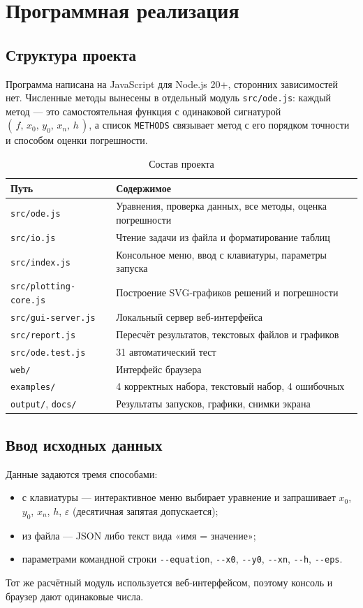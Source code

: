 \documentclass[12pt,a4paper]{article}
\begin{document}
\section{Программная реализация}

\subsection{Структура проекта}
Программа написана на JavaScript для Node.js 20+, сторонних зависимостей нет.
Численные методы вынесены в отдельный модуль \texttt{src/ode.js}: каждый метод
--- это самостоятельная функция с одинаковой сигнатурой
$(\,f,\,x_0,\,y_0,\,x_n,\,h\,)$, а список \texttt{METHODS} связывает метод
с его порядком точности и способом оценки погрешности.

\begin{table}[H]\centering\small
\caption{Состав проекта}
\begin{tabular}{ll}\toprule
Путь & Содержимое\\\midrule
\texttt{src/ode.js} & Уравнения, проверка данных, все методы, оценка погрешности\\
\texttt{src/io.js} & Чтение задачи из файла и форматирование таблиц\\
\texttt{src/index.js} & Консольное меню, ввод с клавиатуры, параметры запуска\\
\texttt{src/plotting-core.js} & Построение SVG-графиков решений и погрешности\\
\texttt{src/gui-server.js} & Локальный сервер веб-интерфейса\\
\texttt{src/report.js} & Пересчёт результатов, текстовых файлов и графиков\\
\texttt{src/ode.test.js} & 31 автоматический тест\\
\texttt{web/} & Интерфейс браузера\\
\texttt{examples/} & 4 корректных набора, текстовый набор, 4 ошибочных\\
\texttt{output/}, \texttt{docs/} & Результаты запусков, графики, снимки экрана\\\bottomrule
\end{tabular}\end{table}

\subsection{Ввод исходных данных}
Данные задаются тремя способами:
\begin{itemize}[leftmargin=*]
\item с клавиатуры --- интерактивное меню выбирает уравнение и запрашивает
$x_0$, $y_0$, $x_n$, $h$, $\varepsilon$ (десятичная запятая допускается);
\item из файла --- JSON либо текст вида «имя = значение»;
\item параметрами командной строки \texttt{-{}-equation}, \texttt{-{}-x0},
\texttt{-{}-y0}, \texttt{-{}-xn}, \texttt{-{}-h}, \texttt{-{}-eps}.
\end{itemize}
Тот же расчётный модуль используется веб-интерфейсом, поэтому консоль
и браузер дают одинаковые числа.
\end{document}
